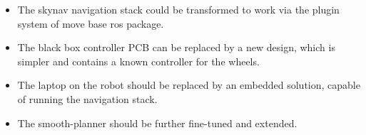 \documentclass[a4paper]{article}
\begin{document}
\begin{itemize}
  \item The skynav navigation stack could be transformed to work via the plugin system of
    move base ros package.
  \item The black box controller PCB can be replaced by a new design, which is simpler
    and contains a known controller for the wheels.
  \item The laptop on the robot should be replaced by an embedded solution, capable of
    running the navigation stack.
  \item The smooth-planner should be further fine-tuned and extended.
\end{itemize}
\end{document}
